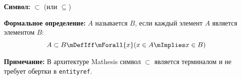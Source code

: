 

\hypertarget{term-subset}{}
\hypertarget{term-subset}{}
\begin{object} %



\textbf{Символ:} $\subset$ (или $\subseteq$)

\textbf{Формальное определение:}
 $A$ называется   $B$, если каждый элемент $A$ является элементом $B$:
\[ A \subset B \mDefIff \mForall{x} (x \in A \mImplies x \in B) \]

\textbf{Примечание:} В архитектуре Mathesis символ $\subset$ является терминалом и не требует обертки в \texttt{entityref}.
\end{object}